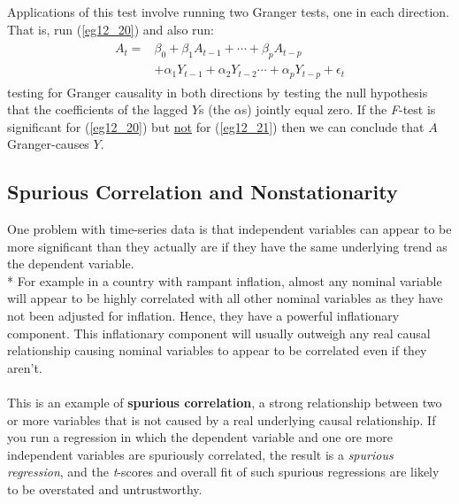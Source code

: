 \documentclass[11pt]{article}
\begin{document}
Applications of this test involve running two Granger tests, one in each direction. That is, run (\ref{eg12_20}) and also run:
\begin{align}
\label{eg12_21}
\begin{split}
A_t = &\beta_0 + \beta_1A_{t-1} + \cdots + \beta_pA_{t-p} \\&+ \alpha_1Y_{t-1} + \alpha_2Y_{t-2} \cdots + \alpha_pY_{t-p} + \epsilon_t 
\end{split}
\end{align}
testing for Granger causality in both directions by testing the null hypothesis that the coefficients of the lagged $Y$s (the $\alpha$s) jointly equal zero. If the \textit{F}-test is significant for (\ref{eg12_20}) but \underline{not} for (\ref{eg12_21}) then we can conclude that $A$ Granger-causes $Y$. 
\subsection{Spurious Correlation and Nonstationarity}
One problem with time-series data is that independent variables can appear to be more significant than they actually are if they have the same underlying trend as the dependent variable.\\*
For example in a country with rampant inflation, almost any nominal variable will appear to be highly correlated with all other nominal variables as they have not been adjusted for inflation. Hence, they have a powerful inflationary component. This inflationary component will usually outweigh any real causal relationship causing nominal variables to appear to be correlated even if they aren't.\\ \\
This is an example of \textbf{spurious correlation}, a strong relationship between two or more variables that is not caused by a real underlying causal relationship. If you run a regression in which the dependent variable and one ore more independent variables are spuriously correlated, the result is a \textit{spurious regression}, and the \textit{t}-scores and overall fit of such spurious regressions are likely to be overstated and untrustworthy.
\end{document}
